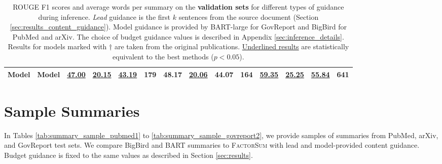\documentclass[11pt,table]{article}
\newcommand{\modelname}{FactorSum}
\begin{document}
\begin{table*}[h]
\begin{tabular}{lc|cccc|cccc|cccc}
    Model & Model & \underline{47.00} & \underline{20.15} & \underline{43.19} & 179 & 48.17 & \underline{20.06} & 44.07 & 164 & \underline{59.35} & \underline{25.25} & \underline{55.84} & 641 \\
    \bottomrule
  \end{tabular}
  \caption{ROUGE F1 scores and average words per summary on the \textbf{validation sets} for different types of guidance during inference. \emph{Lead} guidance is the first $k$ sentences from the source document (Section \ref{sec:results_content_guidance}). Model guidance is provided by BART-large for GovReport and BigBird for PubMed and arXiv. The choice of budget guidance values is described in Appendix \ref{sec:inference_details}. Results for models marked with $\dagger$ are taken from the original publications. \underline{Underlined results} are statistically  equivalent to the best methods ($p<0.05$).}\label{tab:experiment_results_validation}
\end{table*}


\section{Sample Summaries}
\label{sec:sample_summaries}
In Tables \ref{tab:summary_sample_pubmed1} to \ref{tab:summary_sample_govreport2}, we provide samples of summaries from PubMed, arXiv, and GovReport test sets. We compare BigBird and BART summaries to \textsc{\modelname} with lead and model-provided content guidance. Budget guidance is fixed to the same values as described in Section \ref{sec:results}.
\end{document}
